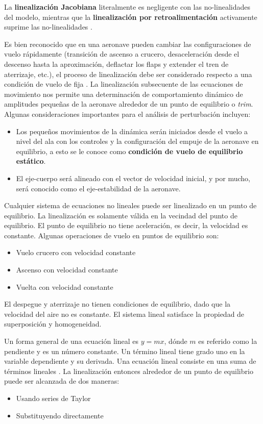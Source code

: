 La \textbf{linealización Jacobiana} literalmente es negligente con las no-linealidades del modelo, mientras que la \textbf{linealización por retroalimentación} activamente suprime las no-linealidades \cite{Mohammad2020}.

Es bien reconocido que en una aeronave pueden cambiar las configuraciones de vuelo rápidamente (transición de ascenso a crucero, desaceleración desde el descenso hasta la aproximación, deflactar los \textit{}{flaps} y extender el tren de aterrizaje, etc.), el proceso de linealización debe ser considerado respecto a una condición de vuelo de fija \cite{Schimdt1998}. 
La linealización subsecuente de las ecuaciones de movimiento nos permite una determinación de comportamiento dinámico de amplitudes pequeñas de la aeronave alrededor de un punto de equilibrio o \textit{trim}. 
Algunas consideraciones importantes para el análisis de perturbación incluyen:

\begin{itemize}
    \item Los pequeños movimientos de la dinámica serán iniciados desde el vuelo a nivel del ala con los controles y la configuración del empuje de la aeronave en equilibrio, a esto se le conoce como \textbf{condición de vuelo de equilibrio estático}.
    \item El eje-cuerpo será alineado con el vector de velocidad inicial, y por mucho, será conocido como el eje-estabilidad de la aeronave.
\end{itemize}

Cualquier sistema de ecuaciones no lineales puede ser linealizado en un punto de equilibrio. La linealización es solamente válida en la vecindad del punto de equilibrio. 
El punto de equilibrio no tiene aceleración, es decir, la velocidad es constante. 
Algunas operaciones de vuelo en puntos de equilibrio son: 
\begin{itemize}
    \item Vuelo crucero con velocidad constante
    \item Ascenso con velocidad constante
    \item Vuelta con velocidad constante
\end{itemize}

El despegue y aterrizaje no tienen condiciones de equilibrio, dado que la velocidad del aire no es constante. El sistema lineal satisface la propiedad de superposición y homogeneidad. 

Un forma general de una ecuación lineal es $y=mx$, dónde $m$ es referido como la pendiente y es un número constante. 
Un término lineal tiene grado uno en la variable dependiente y su derivada. 
Una ecuación lineal consiste en una suma de términos lineales \cite{Mohammad2020}.  
La linealización entonces alrededor de un punto de equilibrio puede ser alcanzada de dos maneras:
\begin{itemize}
    \item Usando series de Taylor
    \item Substituyendo directamente
\end{itemize}

